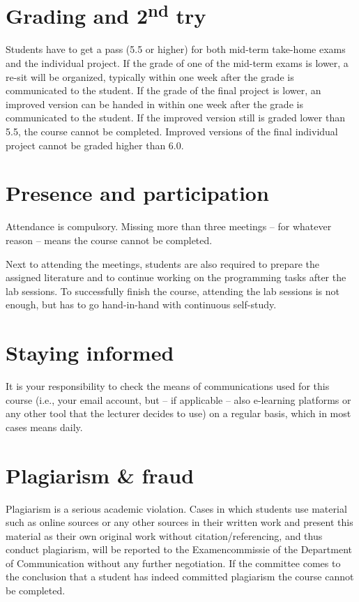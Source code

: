 \documentclass[a4paper,10pt,twocolumn]{report}
\begin{document}
\section{Grading and 2\textsuperscript{nd} try}
Students have to get a pass (5.5 or higher) for both mid-term take-home exams and the individual project. If the grade of one of the mid-term exams is lower, a re-sit will be organized, typically within one week after the grade is communicated to the student.
If the grade of the final project is lower, an improved version can be handed in within one week after the grade is communicated to the student. If the improved version still is graded lower than 5.5, the course cannot be completed. Improved versions of the final individual project cannot be graded higher than 6.0.

\section{Presence and participation}
Attendance is compulsory. Missing more than three meetings – for whatever reason – means the course cannot be completed.

Next to attending the meetings, students are also required to prepare the assigned literature and to continue working on the programming tasks after the lab sessions. To successfully finish the course, attending the lab sessions is not enough, but has to go hand-in-hand with continuous self-study.

\section{Staying informed}
It is your responsibility to check the means of communications used for this course (i.e., your email account, but -- if applicable -- also e-learning platforms or any other tool that the lecturer decides to use) on a regular basis, which in most cases means daily.

\section{Plagiarism \& fraud}
Plagiarism is a serious academic violation. Cases in which students use material such as online sources or any other sources in their written work and present this material as their own original work without citation/referencing, and thus conduct plagiarism, will be reported to the Examencommissie of the Department of Communication without any further negotiation. If the committee comes to the conclusion that a student has indeed committed plagiarism the course cannot be completed.
\end{document}
